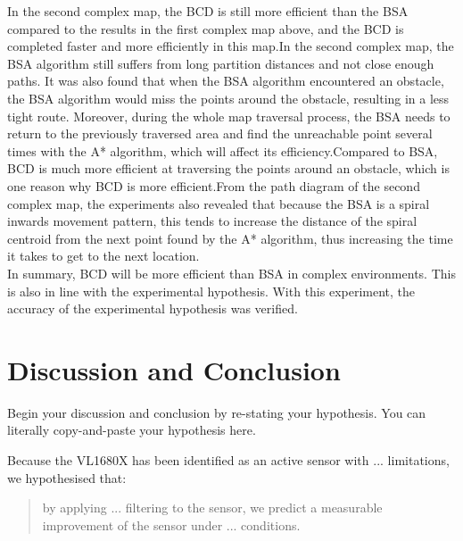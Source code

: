 \documentclass[conference]{IEEEtran}
\begin{document}
In the second complex map, the BCD is still more efficient than the BSA compared to the results in the first complex map above, and the BCD is completed faster and more efficiently in this map.In the second complex map, the BSA algorithm still suffers from long partition distances and not close enough paths. It was also found that when the BSA algorithm encountered an obstacle, the BSA algorithm would miss the points around the obstacle, resulting in a less tight route. Moreover, during the whole map traversal process, the BSA needs to return to the previously traversed area and find the unreachable point several times with the A* algorithm, which will affect its efficiency.Compared to BSA, BCD is much more efficient at traversing the points around an obstacle, which is one reason why BCD is more efficient.From the path diagram of the second complex map, the experiments also revealed that because the BSA is a spiral inwards movement pattern, this tends to increase the distance of the spiral centroid from the next point found by the A* algorithm, thus increasing the time it takes to get to the next location.\\
In summary, BCD will be more efficient than BSA in complex environments. This is also in line with the experimental hypothesis. With this experiment, the accuracy of the experimental hypothesis was verified.


\section{Discussion and Conclusion}

Begin your discussion and conclusion by re-stating your hypothesis. You can literally copy-and-paste your hypothesis here. 

Because the VL1680X has been identified as an active sensor with ... limitations, we hypothesised that:
\begin{quote}
  by applying ... filtering to the sensor, we predict a measurable improvement of the sensor under ... conditions. 
\end{quote}


 

\end{document}
